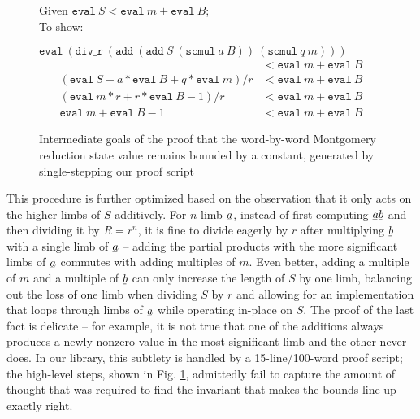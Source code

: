 \documentclass[conference,letterpaper]{IEEEtran}
\newcommand{\bunderline}[1]{\underline{#1\mkern-2mu}\mkern2mu }
\begin{document}
\begin{figure}
  \setlength{\abovedisplayskip}{0pt}%
  \setlength{\belowdisplayskip}{0pt}%
  Given \mbox{\small $\texttt{eval}\ S < \texttt{eval}\ m + \texttt{eval}\ B$};\\
  To show: \par%
  \small
  $\texttt{eval}\ (\texttt{div\_r}\ (\texttt{add}\ (\texttt{add}\ S\ (\texttt{scmul}\ a\ B))\ (\texttt{scmul}\ q\ m)))$
  \begin{align*}
    & < \texttt{eval}\ m + \texttt{eval}\ B \\
    (\texttt{eval}\ S + a*\texttt{eval}\ B + q*\texttt{eval}\ m)/r
    & < \texttt{eval}\ m + \texttt{eval}\ B \\
(\texttt{eval}\ m * r + r * \texttt{eval}\ B - 1)/r
    & < \texttt{eval}\ m + \texttt{eval}\ B \\
\texttt{eval}\ m + \texttt{eval}\ B - 1
    & < \texttt{eval}\ m + \texttt{eval}\ B
  \end{align*}
  \caption{\label{wwbound} Intermediate goals of the proof that the word-by-word Montgomery reduction state value remains bounded by a constant, generated by single-stepping our proof script}
\end{figure}

This procedure is further optimized based on the observation that it only acts on the higher limbs of $S$ additively.
For $n$-limb $\bunderline{a}$, instead of first computing $\bunderline{a}\bunderline{b}$ and then dividing it by $R=r^n$, it is fine to divide eagerly by $r$ after multiplying $\bunderline{b}$ with a single limb of $\bunderline{a}$ -- adding the partial products with the more significant limbs of $\bunderline{a}$ commutes with adding multiples of $m$.
Even better, adding a multiple of $m$ and a multiple of $\bunderline{b}$ can only increase the length of $S$ by one limb, balancing out the loss of one limb when dividing $S$ by $r$ and allowing for an implementation that loops through limbs of $\bunderline{a}$ while operating in-place on $S$.
The proof of the last fact is delicate -- for example, it is not true that one of the additions always produces a newly nonzero value in the most significant limb and the other never does.
In our library, this subtlety is handled by a 15-line/100-word proof script; the high-level steps, shown in Fig. \ref{wwbound}, admittedly fail to capture the amount of thought that was required to find the invariant that makes the bounds line up exactly right.
\end{document}
